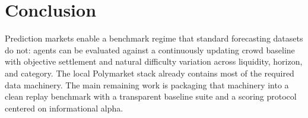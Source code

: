 \documentclass[10pt]{article}
\begin{document}
\section{Conclusion}

Prediction markets enable a benchmark regime that standard forecasting datasets
do not: agents can be evaluated against a continuously updating crowd baseline
with objective settlement and natural difficulty variation across liquidity,
horizon, and category. The local Polymarket stack already contains most of the
required data machinery. The main remaining work is packaging that machinery
into a clean replay benchmark with a transparent baseline suite and a scoring
protocol centered on informational alpha.



\end{document}
